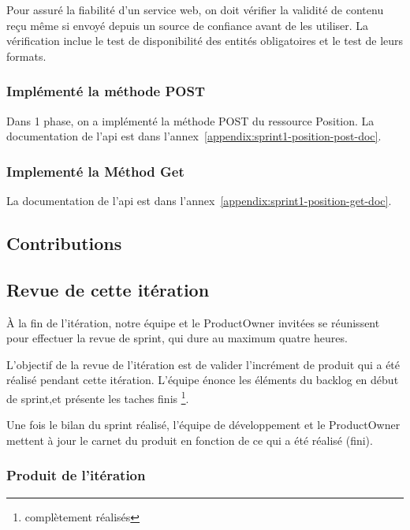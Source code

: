 Pour assuré la fiabilité d'un service web, on doit vérifier la validité de
contenu reçu même si envoyé depuis un source de confiance avant de les
utiliser. La vérification inclue le test de disponibilité des entités
obligatoires et le test de leurs formats.

\subsubsection{Implémenté la méthode POST}

Dans 1\ier{} phase, on a implémenté la méthode POST du ressource Position.
La documentation de l'api est dans l'annex~\ref{appendix:sprint1-position-post-doc}.

\subsubsection{Implementé la Méthod Get}

La documentation de l'api est dans l'annex~\ref{appendix:sprint1-position-get-doc}.


\subsection{Contributions}


\subsection{Revue de cette itération}
À la fin de l'itération, notre équipe et le ProductOwner invitées se
réunissent pour effectuer la revue de sprint, qui dure au maximum quatre
heures. 

L'objectif de la revue de l'itération est de valider
l'incrément de produit qui a été réalisé pendant cette itération. 
L'équipe énonce les éléments du backlog en début de sprint,et présente
les taches finis \footnote{complètement réalisés}.

Une fois le bilan du sprint réalisé, l'équipe de développement et
le ProductOwner mettent à jour le carnet du produit en fonction de ce qui
a été réalisé (fini). 

\subsubsection{Produit de l'itération}


